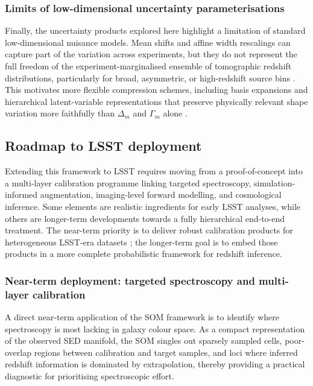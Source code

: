 \subsubsection{Limits of low-dimensional uncertainty parameterisations} \label{sec:6.1.5}

Finally, the uncertainty products explored here highlight a limitation of standard low-dimensional nuisance models. Mean shifts and affine width rescalings can capture part of the variation across experiments, but they do not represent the full freedom of the experiment-marginalised ensemble of tomographic redshift distributions, particularly for broad, asymmetric, or high-redshift source bins \citep{2006ApJ...636...21M}. This motivates more flexible compression schemes, including basis expansions and hierarchical latent-variable representations that preserve physically relevant shape variation more faithfully than \(\Delta_m\) and \(\Gamma_m\) alone \citep{2021A&A...650A.148S, 2022MNRAS.511.2170C, 2023MNRAS.518..709Z}.

\subsection{Roadmap to LSST deployment} \label{sec:6.2}

Extending this framework to LSST requires moving from a proof-of-concept into a multi-layer calibration programme linking targeted spectroscopy, simulation-informed augmentation, imaging-level forward modelling, and cosmological inference. Some elements are realistic ingredients for early LSST analyses, while others are longer-term developments towards a fully hierarchical end-to-end treatment. The near-term priority is to deliver robust calibration products for heterogeneous LSST-era datasets \citep{2019ApJ...873..111I}; the longer-term goal is to embed those products in a more complete probabilistic framework for redshift inference.

\subsubsection{Near-term deployment: targeted spectroscopy and multi-layer calibration} \label{sec:6.2.1}

A direct near-term application of the SOM framework is to identify where spectroscopy is most lacking in galaxy colour space. As a compact representation of the observed SED manifold, the SOM singles out sparsely sampled cells, poor-overlap regions between calibration and target samples, and loci where inferred redshift information is dominated by extrapolation, thereby providing a practical diagnostic for prioritising spectroscopic effort.

